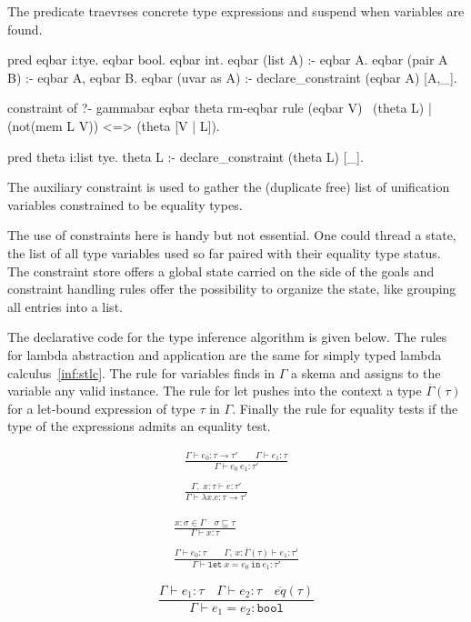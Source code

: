 \documentclass[a4paper, 11pt]{book}
\begin{document}
The  predicate traevrses concrete type expressions and
suspend when variables are found.

\begin{elpicode}
pred eqbar i:tye.
eqbar bool.
eqbar int.
eqbar (list A) :- eqbar A.
eqbar (pair A B) :- eqbar A, eqbar B.
eqbar (uvar as A) :- declare_constraint (eqbar A) [A,_].

constraint of ?- gammabar eqbar theta rm-eqbar {
  rule (eqbar V) \ (theta L) | (not(mem L V)) <=> (theta [V | L]).
}

pred theta i:list tye.
theta L :- declare_constraint (theta L) [_].
\end{elpicode}

The auxiliary constraint  is used to gather the
(duplicate free) list of unification variables constrained to be equality types.

The use of constraints here is handy but not essential. One could thread a state,
the list of all type variables used so far paired with their equality type status.
The constraint store offers a global state carried on the side of the goals
and constraint handling rules offer the possibility to organize the state, like grouping
all entries into a list.

The declarative code for the type inference algorithm is given below.
The rules for lambda abstraction and application are the same
for simply typed lambda calculus~\ref{inf:stlc}.
The rule for variables finds in $\Gamma$ a skema and assigns to the variable
any valid instance. The rule for let pushes into the context a type
$\overline{\Gamma}(\tau)$ for a let-bound expression of type $\tau$ in $\Gamma$.
Finally the rule for equality tests if the type of the expressions admits
an equality test.

\begin{center}
\begin{minipage}{0.45\textwidth}
$$
\begin{array}{cl}
  \displaystyle\frac{\Gamma \vdash e_0:\tau \rightarrow \tau' \quad\quad \Gamma \vdash e_1 : \tau }{\Gamma \vdash e_0\ e_1 : \tau'}\\ \\
  \displaystyle\frac{\Gamma,\;x:\tau\vdash e:\tau'}{\Gamma \vdash \lambda x.e : \tau \rightarrow \tau'}
\end{array}
  $$
\end{minipage}
\begin{minipage}{0.45\textwidth}
$$
\begin{array}{cl}
  \displaystyle\frac{x:\sigma \in \Gamma \quad \sigma \sqsubseteq \tau}{\Gamma \vdash x:\tau}\\ \\
  \displaystyle\frac{\Gamma \vdash e_0:\tau \quad\quad \Gamma,\,x:\bar{\Gamma}(\tau) \vdash e_1:\tau'}{\Gamma \vdash \mathtt{let}\ x = e_0\ \mathtt{in}\ e_1 :  \tau'}
  \end{array}
$$
\end{minipage}
$$ 
\displaystyle\frac{\Gamma \vdash e_1 : \tau \quad \Gamma \vdash e_2 : \tau \quad \overline{eq}(\tau)}{\Gamma \vdash e_1 = e_2: \mathtt{bool}}
$$
\end{center}
\end{document}
